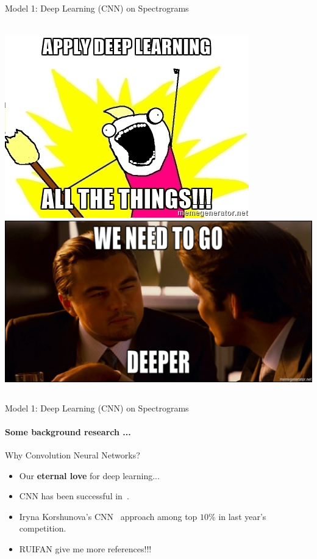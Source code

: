 \documentclass{beamer}
\begin{document}
\begin{frame}{Model 1: Deep Learning (CNN) on Spectrograms}
  \framesubtitle{}
  \begin{columns}
  \includegraphics[scale=0.5]{img/deeplearning.jpg}
    \includegraphics[scale=0.18]{img/deeper.jpg}
  \end{columns}
\end{frame}


\begin{frame}{Model 1: Deep Learning (CNN) on Spectrograms}
  \framesubtitle{Some background research ...}

  \begin{block}{Why Convolution Neural Networks?}
    \begin{itemize}
    \item Our \textbf{eternal love} for deep learning...
    \item CNN has been successful in~\cite{korshunova_faculty_2015}.
    \item Iryna Korshunova's CNN~\cite{korshunova_faculty_2015} approach among
      top $10\%$ in last year's competition.
    \item RUIFAN give me more references!!!
    \end{itemize}
  \end{block}
\end{frame}
\end{document}
